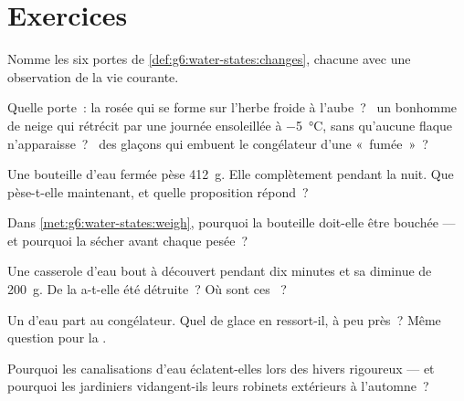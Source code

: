 \section{Exercices}

\begin{exercise}[$\star$]\label{exo:g6:water-states:1}
Nomme les six portes de \cref{def:g6:water-states:changes}, chacune
avec une observation de la vie courante.
\end{exercise}

\begin{exercise}[$\star$]\label{exo:g6:water-states:2}
Quelle porte~: la rosée qui se forme sur l'herbe froide à l'aube~?
\ un bonhomme de neige qui rétrécit par une journée ensoleillée à
\qty{-5}{\celsius}, sans qu'aucune flaque n'apparaisse~? \ des glaçons
qui embuent le congélateur d'une «~fumée~»~?
\end{exercise}

\begin{exercise}[$\star$]\label{exo:g6:water-states:3}
Une bouteille d'eau fermée pèse \qty{412}{g}. Elle 
complètement pendant la nuit. Que pèse-t-elle maintenant, et quelle
proposition répond~?
\end{exercise}

\begin{exercise}[$\star$]\label{exo:g6:water-states:4}
Dans \cref{met:g6:water-states:weigh}, pourquoi la bouteille
doit-elle être bouchée --- et pourquoi la sécher avant chaque pesée~?
\end{exercise}

\begin{exercise}[$\star$]\label{exo:g6:water-states:5}
Une casserole d'eau bout à découvert pendant dix minutes et sa 
diminue de \qty{200}{g}. De la  a-t-elle été détruite~? Où sont
ces ~?
\end{exercise}

\begin{exercise}[$\star$]\label{exo:g6:water-states:6}
Un  d'eau part au congélateur. Quel  de glace en
ressort-il, à peu près~? Même question pour la .
\end{exercise}

\begin{exercise}[$\star$]\label{exo:g6:water-states:7}
Pourquoi les canalisations d'eau éclatent-elles lors des hivers
rigoureux --- et pourquoi les jardiniers vidangent-ils leurs robinets
extérieurs à l'automne~?
\end{exercise}

